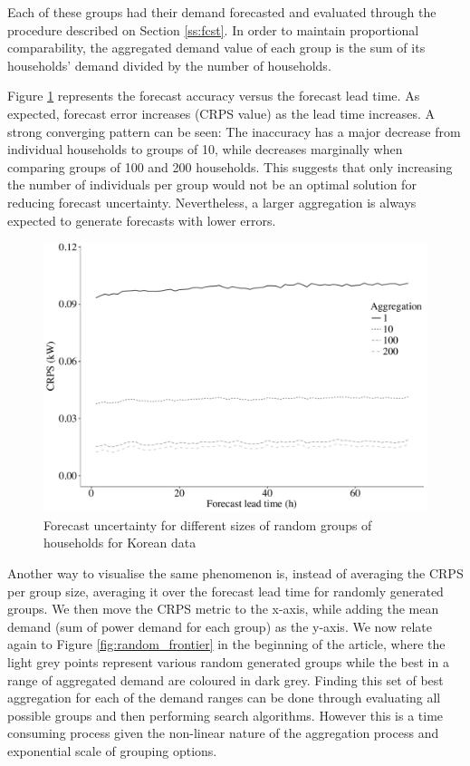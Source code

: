 \documentclass[preprint,3p,11pt,authoryear]{elsarticle}
\begin{document}
Each of these groups had their demand forecasted and evaluated through the procedure described on Section \ref{ss:fcst}.
In order to maintain proportional comparability, the aggregated demand value of each group is the sum of its households' demand divided by the number of households.

Figure \ref{fig:rndgrp} represents the forecast accuracy versus the forecast lead time.
As expected, forecast error increases (CRPS value) as the lead time increases.
A strong converging pattern can be seen:
The inaccuracy has a major decrease from individual households to groups of 10, while decreases marginally when comparing groups of 100 and 200 households.
This suggests that only increasing the number of individuals per group would not be an optimal solution for reducing forecast uncertainty.
Nevertheless, a larger aggregation is always expected to generate forecasts with lower errors.

\begin{figure}
  \centering
  \includegraphics[scale=0.5]{2017-10-13_rndgrp}
  \caption{Forecast uncertainty for different sizes of random groups of households for Korean data}
  \label{fig:rndgrp}
\end{figure}

Another way to visualise the same phenomenon is, instead of averaging the CRPS per group size, averaging it over the forecast lead time for randomly generated groups.
We then move the CRPS metric to the x-axis, while adding the mean demand (sum of power demand for each group) as the y-axis.
We now relate again to Figure \ref{fig:random_frontier} in the beginning of the article, where the light grey points represent various random generated groups while the best in a range of aggregated demand are coloured in dark grey.
Finding this set of best aggregation for each of the demand ranges can be done through evaluating all possible groups and then performing search algorithms.
However this is a time consuming process given the non-linear nature of the aggregation process and exponential scale of grouping options.
\end{document}
